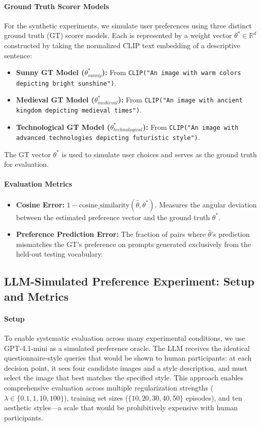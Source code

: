 \documentclass{article}
\begin{document}
\paragraph{Ground Truth Scorer Models}\label{sec:appendix_exp_details_gt_scorer}
For the synthetic experiments, we simulate user preferences using three distinct ground truth (GT) scorer models. Each is represented by a weight vector $\theta^* \in \mathbb{R}^d$ constructed by taking the normalized CLIP text embedding of a descriptive sentence:
\begin{itemize}
    \item \textbf{Sunny GT Model ($\theta^*_{sunny}$):} From \texttt{CLIP("An image with warm colors depicting bright sunshine")}.
    \item \textbf{Medieval GT Model ($\theta^*_{medieval}$):} From \texttt{CLIP("An image with ancient kingdom depicting medieval times")}.
    \item \textbf{Technological GT Model ($\theta^*_{technological}$):} From \texttt{CLIP("An image with advanced technologies depicting futuristic style")}.
\end{itemize}
The GT vector $\theta^*$ is used to simulate user choices and serves as the ground truth for evaluation.

\paragraph{Evaluation Metrics}\label{sec:appendix_exp_details_metrics}
\begin{itemize}
    \item \textbf{Cosine Error:} $1 - \text{cosine\_similarity}(\hat{\theta}, \theta^*)$. Measures the angular deviation between the estimated preference vector and the ground truth $\theta^*$.
    \item \textbf{Preference Prediction Error:} The fraction of pairs where $\hat{\theta}$'s prediction mismatches the GT's preference on prompts generated exclusively from the held-out testing vocabulary.
\end{itemize}

\subsection{LLM-Simulated Preference Experiment: Setup and Metrics}
\label{sec:appendix_exp_details_human}

\paragraph{Setup}
To enable systematic evaluation across many experimental conditions, we use GPT-4.1-mini as a simulated preference oracle. The LLM receives the identical questionnaire-style queries that would be shown to human participants: at each decision point, it sees four candidate images and a style description, and must select the image that best matches the specified style. This approach enables comprehensive evaluation across multiple regularization strengths ($\lambda \in \{0.1, 1, 10, 100\}$), training set sizes ($\{10, 20, 30, 40, 50\}$ episodes), and ten aesthetic styles---a scale that would be prohibitively expensive with human participants.
\end{document}
